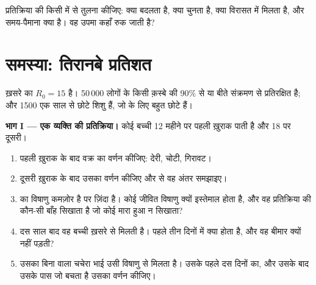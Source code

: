 \begin{exercise}[$\star\star\star$]\label{exo:g12:adaptive-immunity:15}
 प्रतिक्रिया की किसी  में  से तुलना
कीजिए: क्या बदलता है, क्या चुनता है, क्या विरासत में मिलता है, और समय-पैमाना
क्या है। वह उपमा कहाँ रुक जाती है?
\end{exercise}

\section{समस्या: तिरानबे प्रतिशत}

\begin{problem}
\label{pb:g12:adaptive-immunity:1}
ख़सरे का $R_0 = 15$ है। 50\,000 लोगों के किसी क़स्बे की 90\%   से
या बीते संक्रमण से प्रतिरक्षित है; और 1500 एक साल से छोटे शिशु हैं, जो 
के लिए बहुत छोटे हैं।

\medskip
\noindent\textbf{भाग I --- एक व्यक्ति की प्रतिक्रिया।}
कोई बच्ची 12 महीने पर पहली ख़ुराक पाती है और 18 पर दूसरी।
\begin{enumerate}
  \item पहली ख़ुराक के बाद  वक्र का वर्णन कीजिए: देरी, चोटी,
        गिरावट।
  \item दूसरी ख़ुराक के बाद उसका वर्णन कीजिए और  से वह अंतर
        समझाइए।
  \item {} का विषाणु कमज़ोर है पर ज़िंदा है। कोई जीवित विषाणु क्यों
        इस्तेमाल होता है, और वह प्रतिक्रिया की कौन-सी बाँह सिखाता है जो
        कोई मारा हुआ न सिखाता?
  \item दस साल बाद वह बच्ची ख़सरे से मिलती है। पहले तीन दिनों में क्या होता
        है, और वह बीमार क्यों नहीं पड़ती?
  \item उसका बिना  वाला चचेरा भाई उसी विषाणु से मिलता है। उसके पहले दस
        दिनों का, और उसके बाद उसके पास जो बचता है उसका वर्णन कीजिए।
\end{enumerate}


\end{problem}
